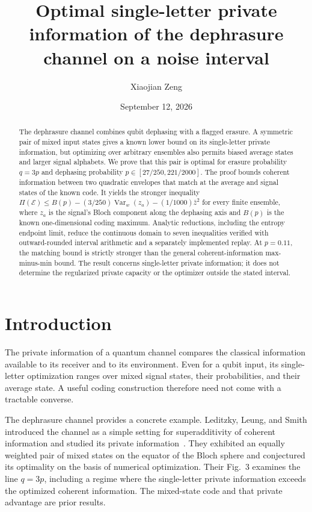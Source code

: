 \documentclass[aps,pra,reprint,amsmath,amssymb,longbibliography,nofootinbib]{revtex4-2}
\newcommand{\Var}{\operatorname{Var}}
\newcommand{\cE}{\mathcal E}
\begin{document}
\title{Optimal single-letter private information of the dephrasure channel on a noise interval}
\author{Xiaojian Zeng}
\date{September 12, 2026}
\begin{abstract}
The dephrasure channel combines qubit dephasing with a flagged erasure. A symmetric pair of mixed input states gives a known lower bound on its single-letter private information, but optimizing over arbitrary ensembles also permits biased average states and larger signal alphabets. We prove that this pair is optimal for erasure probability $q=3p$ and dephasing probability $p\in[27/250,221/2000]$. The proof bounds coherent information between two quadratic envelopes that match at the average and signal states of the known code. It yields the stronger inequality $\Pi(\cE)\le B(p)-(3/250)\Var_w(z_a)-(1/1000)\bar z^2$ for every finite ensemble, where $z_a$ is the signal's Bloch component along the dephasing axis and $B(p)$ is the known one-dimensional coding maximum. Analytic reductions, including the entropy endpoint limit, reduce the continuous domain to seven inequalities verified with outward-rounded interval arithmetic and a separately implemented replay. At $p=0.11$, the matching bound is strictly stronger than the general coherent-information max-minus-min bound. The result concerns single-letter private information; it does not determine the regularized private capacity or the optimizer outside the stated interval.
\end{abstract}
\maketitle

\section{Introduction}
The private information of a quantum channel compares the classical information available to its receiver and to its environment. Even for a qubit input, its single-letter optimization ranges over mixed signal states, their probabilities, and their average state. A useful coding construction therefore need not come with a tractable converse.

The dephrasure channel provides a concrete example. Leditzky, Leung, and Smith introduced the channel as a simple setting for superadditivity of coherent information and studied its private information~\cite{LLS2018}. They exhibited an equally weighted pair of mixed states on the equator of the Bloch sphere and conjectured its optimality on the basis of numerical optimization. Their Fig.~3 examines the line $q=3p$, including a regime where the single-letter private information exceeds the optimized coherent information. The mixed-state code and that private advantage are prior results.
\end{document}
